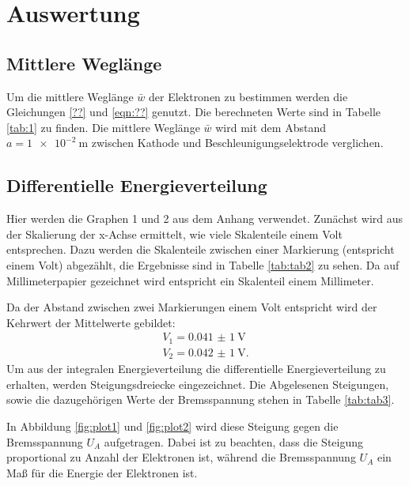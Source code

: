 \section{Auswertung}
\label{sec:Auswertung}
\subsection{Mittlere Weglänge}

Um die mittlere Weglänge $\bar{w}$ der Elektronen zu bestimmen werden die Gleichungen
\ref{??} und \ref{eqn:??} genutzt. Die berechneten Werte sind in Tabelle
\ref{tab:1} zu finden. Die mittlere Weglänge $\bar{w}$ wird mit dem Abstand
$a=\SI{1e-2}{\m}$ zwischen
Kathode und Beschleunigungselektrode verglichen.



\subsection{Differentielle Energieverteilung}
Hier werden die Graphen 1 und 2 aus dem Anhang verwendet.
Zunächst wird aus der Skalierung der x-Achse ermittelt, wie viele
Skalenteile einem Volt entsprechen. Dazu werden die Skalenteile zwischen einer
Markierung (entspricht einem Volt) abgezählt, die Ergebnisse sind in
Tabelle \ref{tab:tab2} zu sehen. Da auf Millimeterpapier gezeichnet wird entspricht
ein Skalenteil einem Millimeter.


Da der Abstand zwischen zwei Markierungen einem Volt entspricht wird der
Kehrwert der Mittelwerte gebildet:
\begin{align*}
  V_1=\SI{0,041(1)}{\V}\\
  V_2=\SI{0,042(1)}{\V}.
\end{align*}
Um aus der integralen
Energieverteilung die differentielle Energieverteilung zu erhalten, werden
Steigungsdreiecke eingezeichnet. Die Abgelesenen Steigungen, sowie
die dazugehörigen Werte der Bremsspannung stehen in Tabelle \ref{tab:tab3}.



In Abbildung \ref{fig:plot1} und \ref{fig:plot2} wird
diese Steigung gegen die Bremsspannung $U_A$ aufgetragen. Dabei ist zu beachten, dass
die Steigung proportional zu Anzahl der Elektronen ist, während die Bremsspannung $U_A$
ein Maß für die Energie der Elektronen ist.


